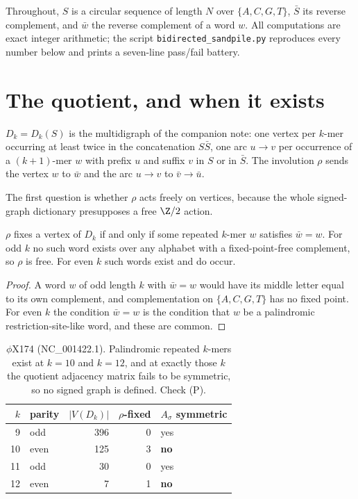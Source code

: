 Throughout, $S$ is a circular sequence of length $N$ over $\{A,C,G,T\}$, $\bar S$ its reverse
complement, and $\bar w$ the reverse complement of a word $w$. All computations are exact
integer arithmetic; the script \texttt{bidirected\_sandpile.py} reproduces every number below
and prints a seven-line pass/fail battery.

\section{The quotient, and when it exists}

\begin{definition}
$D_k=D_k(S)$ is the multidigraph of the companion note: one vertex per $k$-mer occurring at
least twice in the concatenation $S\bar S$, one arc $u\to v$ per occurrence of a
$(k{+}1)$-mer $w$ with prefix $u$ and suffix $v$ in $S$ or in $\bar S$. The involution
$\rho$ sends the vertex $w$ to $\bar w$ and the arc $u\to v$ to $\bar v\to\bar u$.
\end{definition}

The first question is whether $\rho$ acts freely on vertices, because the whole signed-graph
dictionary presupposes a free $\Z/2$ action.

\begin{proposition}\label{Bio7:prop:parity}
$\rho$ fixes a vertex of $D_k$ if and only if some repeated $k$-mer $w$ satisfies
$\bar w=w$. For odd $k$ no such word exists over any alphabet with a fixed-point-free
complement, so $\rho$ is free. For even $k$ such words exist and do occur.
\end{proposition}

\begin{proof}
A word $w$ of odd length $k$ with $\bar w=w$ would have its middle letter equal to its own
complement, and complementation on $\{A,C,G,T\}$ has no fixed point. For even $k$ the
condition $\bar w=w$ is the condition that $w$ be a palindromic restriction-site-like word,
and these are common.
\end{proof}

\begin{table}[t]
\centering
\begin{tabular}{rlrrl}
\toprule
$k$ & parity & $|V(D_k)|$ & $\rho$-fixed & $A_\sigma$ symmetric\\
\midrule
 9 & odd  & 396 & 0 & yes\\
10 & even & 125 & 3 & \textbf{no}\\
11 & odd  &  30 & 0 & yes\\
12 & even &   7 & 1 & \textbf{no}\\
\bottomrule
\end{tabular}
\caption{$\phi$X174 (NC\_001422.1). Palindromic repeated $k$-mers exist at $k=10$ and
$k=12$, and at exactly those $k$ the quotient adjacency matrix fails to be symmetric, so no
signed graph is defined. Check (P).}
\label{Bio7:tab:parity}
\end{table}

